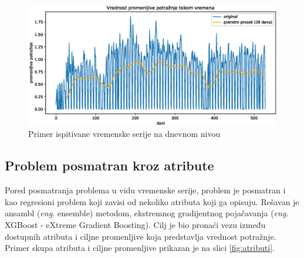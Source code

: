 \documentclass[12pt,oneside]{memoir}
\begin{document}
\begin{figure}[!ht]
  \centering
  \includegraphics[width=1\textwidth]{./grafici/vremenska_serija_primer.eps}
  \caption{Primer ispitivane vremenske serije na dnevnom nivou} 
  \label{fig:vremenska_serija}
\end{figure}

\subsection{Problem posmatran kroz atribute}
Pored posmatranja problema u vidu vremenske serije, problem je posmatran i kao regresioni problem koji zavisi od nekoliko atributa koji ga opisuju. Rešavan je ansambl (\textit{eng.} ensemble) metodom, ekstremnog gradijentnog pojačavanja (\textit{eng.} XGBoost - eXtreme Gradient Boosting). Cilj je bio pronaći vezu između dostupnih atributa i ciljne promenljive koja predstavlja vrednost potražnje. Primer skupa atributa i ciljne promenljive prikazan je na slici \ref{fig:atributi}.
\end{document}
